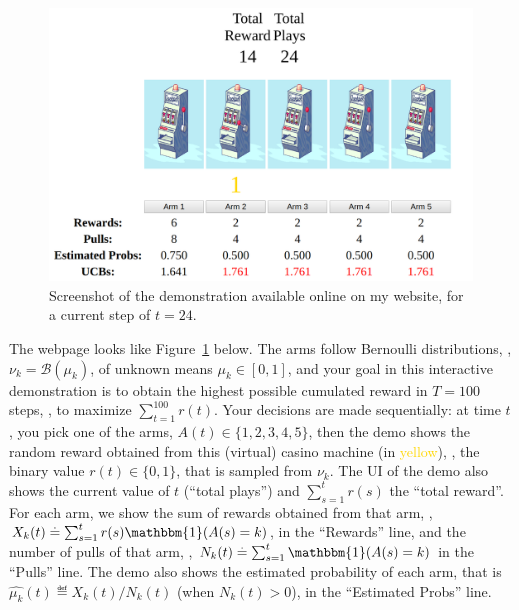 
\begin{figure}[h!]  %
    \centering
    \includegraphics[width=0.85\linewidth]{2-Chapters/2-Chapter/Images/example_of_a_5_arm_bandit_problem.png}
    \caption[Screenshot of the demonstration for a current step of $t=24$.]{Screenshot of the demonstration available online on my website, for a current step of $t=24$.}
    \label{fig:2:example_of_a_5_arm_bandit_problem}
\end{figure}


The webpage looks like Figure~\ref{fig:2:example_of_a_5_arm_bandit_problem} below.
The arms follow Bernoulli distributions, \ie, $\nu_k = \mathcal{B}(\mu_k)$, of unknown means $\mu_k\in[0,1]$, and your goal in this interactive demonstration is to obtain the highest possible cumulated reward in $T=100$ steps, \ie, to maximize $\sum_{t=1}^{100} r(t)$.
Your decisions are made sequentially: at time $t$, you pick one of the arms, $A(t) \in\{1,2,3,4,5\}$, then the demo shows the random reward obtained from this (virtual) casino machine (in \textcolor{gold}{yellow}), \ie, the binary value $r(t)\in\{0,1\}$, that is sampled \iid{} from $\nu_k$.
%
The UI of the demo also shows the current value of $t$ (``total plays'') and $\sum_{s=1}^t r(s)$ the ``total reward''.
For each arm, we show the sum of rewards obtained from that arm, \ie, $X_k(t) \eqdef \sum_{s=1}^t r(s) \mathbbm{1}(A(s) = k)$, in the ``Rewards'' line, and the number of pulls of that arm, \ie, $N_k(t) \eqdef \sum_{s=1}^t \mathbbm{1}(A(s) = k)$ in the ``Pulls'' line.
%
The demo also shows the estimated probability of each arm, that is $\widehat{\mu_k}(t) \eqdef X_k(t) / N_k(t)$ (when $N_k(t)>0$), in the ``Estimated Probs'' line.

